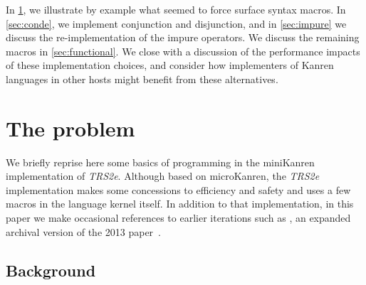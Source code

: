 \documentclass[sigplan,balance=true,pbalance=true,natbib=false]{acmart}
\begin{document}
In \cref{sec:all-aboard}, we illustrate by example what seemed to
force surface syntax macros. In \cref{sec:conde}, we implement
conjunction and disjunction, and in \cref{sec:impure} we discuss the
re-implementation of the impure operators. We discuss the remaining
macros in \cref{sec:functional}. We close with a discussion of the
performance impacts of these implementation choices, and consider how
implementers of Kanren languages in other hosts might benefit from
these alternatives.

\section{The problem}\label{sec:all-aboard}

We briefly reprise here some basics of programming in the miniKanren
implementation of \emph{TRS2e}. Although based on microKanren, the
\emph{TRS2e} implementation makes some concessions to efficiency and
safety and uses a few macros in the language kernel itself. In
addition to that implementation, in this paper we make occasional
references to earlier iterations such as
\citet{hemann2016small}, an expanded
archival version of the 2013 paper~\cite{hemann2013muKanren}.

\subsection{Background}
\end{document}

